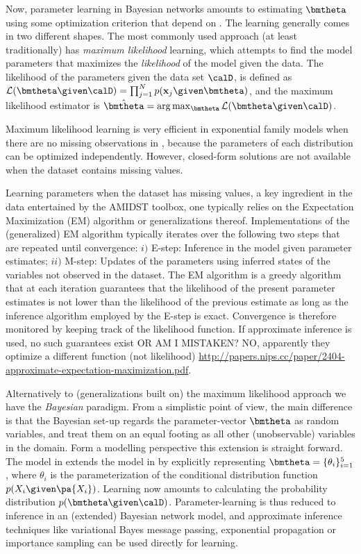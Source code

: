 Now, parameter learning in Bayesian networks amounts to estimating $\bmtheta$ using some optimization criterion that depend on \calD. The learning generally comes in two different shapes. The most commonly used approach (at least  traditionally) has \textit{maximum likelihood} learning, which attempts to find the model parameters that maximizes the \textit{likelihood} of the model given the data. 
The likelihood of the parameters given the data set $\calD$, 
is defined as  $\mathcal{L}(\bmtheta \given \calD)= \prod_{j=1}^N p(\bx_j\given\bmtheta)$,
and the maximum likelihood estimator is $\hat{\bmtheta}=\arg\max_{\bmtheta} \mathcal{L}(\bmtheta \given \calD)$. 

Maximum likelihood learning is very efficient in exponential family models when there are no missing observations in \calD, because the parameters of each distribution can be optimized independently. 
However, closed-form solutions are not available when the dataset contains missing values. 

Learning parameters when the dataset has missing values, a key ingredient in the data entertained by the AMIDST toolbox, one typically relies on the  Expectation Maximization (EM) algorithm or generalizations thereof. Implementations of the (generalized) EM algorithm typically iterates over the following two steps that are repeated until convergence: $i)$ E-step: Inference in the model given parameter estimates; $ii)$ M-step: Updates of the parameters using inferred states of the variables not observed in the dataset. The EM algorithm is a greedy algorithm that at each iteration guarantees that the likelihood of the present parameter estimates is not lower than the likelihood of the previous estimate as long as the inference algorithm employed by the E-step is exact. Convergence is therefore monitored by keeping track of the likelihood function. If approximate inference is used, no such guarantees exist  OR AM I MISTAKEN? NO,  apparently they optimize a different function (not likelihood) \url{http://papers.nips.cc/paper/2404-approximate-expectation-maximization.pdf}.

Alternatively to (generalizations built on) the maximum likelihood approach we have the \textit{Bayesian}  paradigm. From a simplistic point of view, the main difference is that the Bayesian set-up regards the parameter-vector $\bmtheta$ as random variables, and treat them on an equal footing as all other (unobservable) variables in the domain. Form a modelling perspective this extension is straight forward. The model in   extends the model in  by explicitly representing $\bmtheta=\{\theta_i\}_{i=1}^5$, where $\theta_i$ is the parameterization of the conditional distribution function $p(X_i\given\pa{X_i})$. Learning now amounts to calculating the probability distribution $p(\bmtheta\given\calD)$. Parameter-learning is thus reduced to inference in an (extended) Bayesian network model, and approximate inference techniques like variational Bayes message passing, exponential propagation or importance sampling can be used directly for learning. 

